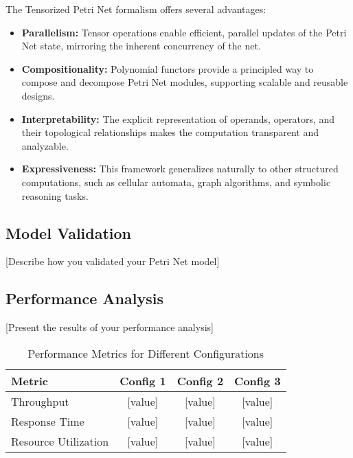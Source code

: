 \label{sec:results}

The Tensorized Petri Net formalism offers several advantages:

\begin{itemize}
    \item \textbf{Parallelism:} Tensor operations enable efficient, parallel updates of the Petri Net state, mirroring the inherent concurrency of the net.
    \item \textbf{Compositionality:} Polynomial functors provide a principled way to compose and decompose Petri Net modules, supporting scalable and reusable designs.
    \item \textbf{Interpretability:} The explicit representation of operands, operators, and their topological relationships makes the computation transparent and analyzable.
    \item \textbf{Expressiveness:} This framework generalizes naturally to other structured computations, such as cellular automata, graph algorithms, and symbolic reasoning tasks.
\end{itemize}

\subsection{Model Validation}

[Describe how you validated your Petri Net model]

\subsection{Performance Analysis}

[Present the results of your performance analysis]

\begin{table}[htbp]
\centering
\caption{Performance Metrics for Different Configurations}
\label{tab:performance}
\begin{tabular}{@{}lccc@{}}
\toprule
\textbf{Metric} & \textbf{Config 1} & \textbf{Config 2} & \textbf{Config 3} \\
\midrule
Throughput & [value] & [value] & [value] \\
Response Time & [value] & [value] & [value] \\
Resource Utilization & [value] & [value] & [value] \\
\bottomrule
\end{tabular}
\end{table}

